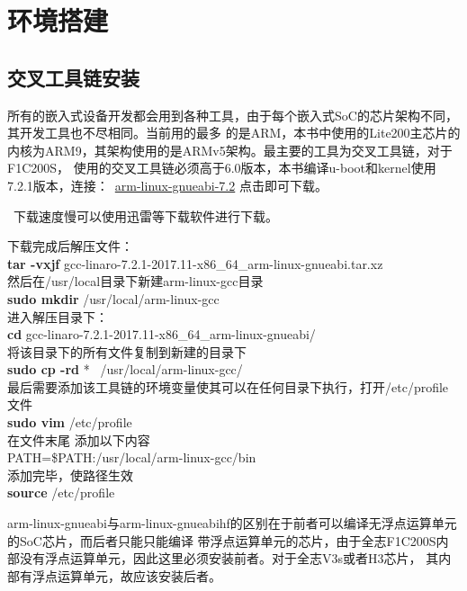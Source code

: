 \section{环境搭建}
\subsection{交叉工具链安装}
所有的嵌入式设备开发都会用到各种工具，由于每个嵌入式SoC的芯片架构不同，其开发工具也不尽相同。当前用的最多
的是ARM，本书中使用的Lite200主芯片的内核为ARM9，其架构使用的是ARMv5架构。最主要的工具为交叉工具链，对于F1C200S，
使用的交叉工具链必须高于6.0版本，本书编译u-boot和kernel使用7.2.1版本，连接：\faChain \ 
\href{https://releases.linaro.org/components/toolchain/binaries/7.2-2017.11/arm-linux-gnueabi/gcc-linaro-7.2.1-2017.11-x86_64_arm-linux-gnueabi.tar.xz}{arm-linux-gnueabi-7.2}
\quad 点击即可下载。
\begin{tcolorbox}[colback=red!5!white,colframe=red!75!black]
	\faBellO \ 下载速度慢可以使用迅雷等下载软件进行下载。
\end{tcolorbox}
\noindent
下载完成后解压文件：\\
\textbf{tar -vxjf } gcc-linaro-7.2.1-2017.11-x86\_64\_arm-linux-gnueabi.tar.xz \\
然后在/usr/local目录下新建arm-linux-gcc目录 \\
\textbf{sudo mkdir } /usr/local/arm-linux-gcc \\
进入解压目录下：\\
\textbf{cd  } gcc-linaro-7.2.1-2017.11-x86\_64\_arm-linux-gnueabi/ \\
将该目录下的所有文件复制到新建的目录下 \\
\textbf{sudo cp -rd}  *  \  /usr/local/arm-linux-gcc/ \\
最后需要添加该工具链的环境变量使其可以在任何目录下执行，打开/etc/profile文件\\
\textbf{sudo vim }  /etc/profile  \\
在文件末尾 添加以下内容\\
PATH=\$PATH:/usr/local/arm-linux-gcc/bin \\
添加完毕，使路径生效 \\
\textbf{source }  /etc/profile  

\begin{note}
arm-linux-gnueabi与arm-linux-gnueabihf的区别在于前者可以编译无浮点运算单元的SoC芯片，而后者只能只能编译
带浮点运算单元的芯片，由于全志F1C200S内部没有浮点运算单元，因此这里必须安装前者。对于全志V3s或者H3芯片，
其内部有浮点运算单元，故应该安装后者。
\end{note}

